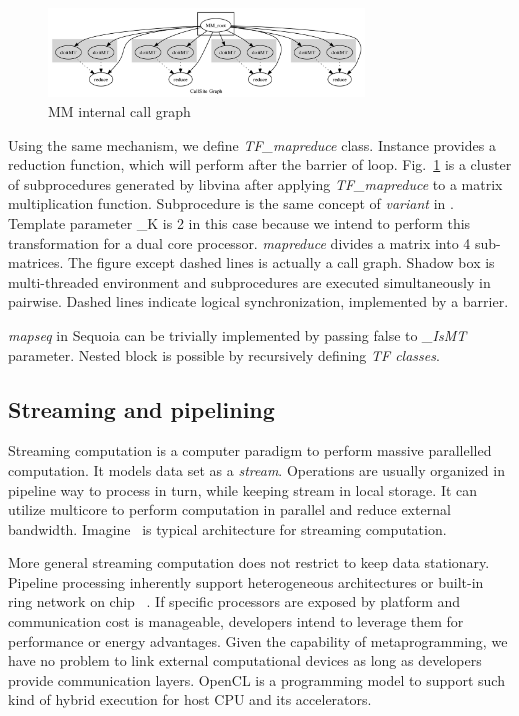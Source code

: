 \documentclass[10pt, conference, compsocconf]{IEEEtran}
\begin{document}
\begin{figure}
\centering
\includegraphics[width=3.3in]{test_matrix}
\caption{MM internal call graph}\label{fig:mm}
\end{figure}

Using the same mechanism, we define \emph{TF\_mapreduce}
class. Instance provides a reduction function, which will perform
after the barrier of loop. Fig.~\ref{fig:mm} is a cluster of subprocedures generated by libvina
after applying \emph{TF\_mapreduce} to a matrix multiplication
function. Subprocedure is the same concept of \emph{variant } in
\cite{sequoia, merge}. Template parameter \_K is 2 in this case because we intend
to perform this transformation for a dual core processor. \emph{mapreduce}
divides a matrix into 4 sub-matrices. The figure except dashed lines
is actually a call graph. Shadow box is multi-threaded environment and
subprocedures are executed simultaneously in pairwise. Dashed lines
indicate logical synchronization, implemented by a barrier.

\emph{mapseq} in Sequoia can be trivially implemented by
passing false to \emph{\_IsMT} parameter. Nested block is possible by
recursively defining \emph{TF classes}.

\subsection{Streaming and pipelining}
Streaming computation is a computer paradigm to perform massive parallelled computation. It models data set as a \emph{stream}. Operations are usually organized in pipeline way to process in turn, while keeping stream in local storage. It can utilize multicore to perform computation in parallel and reduce external bandwidth.  Imagine~\cite{imagine} is typical architecture for
streaming computation.


More general streaming computation does not restrict to keep data
stationary. Pipeline processing inherently support heterogeneous
architectures or built-in ring network on chip ~\cite{cellbe, larrabee}. If specific processors
are exposed by platform and communication cost is manageable, developers
intend to leverage  them for performance or energy
advantages. Given the capability of metaprogramming, we have no problem to link external
computational devices as long as developers provide communication
layers. OpenCL is a programming model to support such kind of hybrid
execution for host CPU and its accelerators. 
\end{document}
